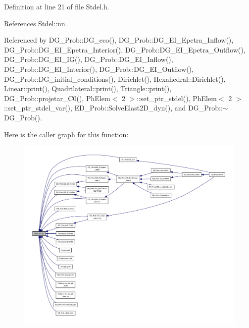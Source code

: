 Definition at line 21 of file Stdel.\+h.



References Stdel\+::nn.



Referenced by D\+G\+\_\+\+Prob\+::\+D\+G\+\_\+eco(), D\+G\+\_\+\+Prob\+::\+D\+G\+\_\+\+E\+I\+\_\+\+Epetra\+\_\+\+Inflow(), D\+G\+\_\+\+Prob\+::\+D\+G\+\_\+\+E\+I\+\_\+\+Epetra\+\_\+\+Interior(), D\+G\+\_\+\+Prob\+::\+D\+G\+\_\+\+E\+I\+\_\+\+Epetra\+\_\+\+Outflow(), D\+G\+\_\+\+Prob\+::\+D\+G\+\_\+\+E\+I\+\_\+\+I\+G(), D\+G\+\_\+\+Prob\+::\+D\+G\+\_\+\+E\+I\+\_\+\+Inflow(), D\+G\+\_\+\+Prob\+::\+D\+G\+\_\+\+E\+I\+\_\+\+Interior(), D\+G\+\_\+\+Prob\+::\+D\+G\+\_\+\+E\+I\+\_\+\+Outflow(), D\+G\+\_\+\+Prob\+::\+D\+G\+\_\+initial\+\_\+conditions(), Dirichlet(), Hexahedral\+::\+Dirichlet(), Linear\+::print(), Quadrilateral\+::print(), Triangle\+::print(), D\+G\+\_\+\+Prob\+::projetar\+\_\+\+C0(), Ph\+Elem$<$ 2 $>$\+::set\+\_\+ptr\+\_\+stdel(), Ph\+Elem$<$ 2 $>$\+::set\+\_\+ptr\+\_\+stdel\+\_\+var(), E\+D\+\_\+\+Prob\+::\+Solve\+Elast2\+D\+\_\+dyn(), and D\+G\+\_\+\+Prob\+::$\sim$\+D\+G\+\_\+\+Prob().

Here is the caller graph for this function\+:
\nopagebreak
\begin{figure}[H]
\begin{center}
\leavevmode
\includegraphics[width=350pt]{classStdel_a6086dceed8fe3dd410da0d6b84f02377_icgraph}
\end{center}
\end{figure}
\mbox{\label{classStdel_ae2ab461d1bc8d9f6006665fe03684845}} 
